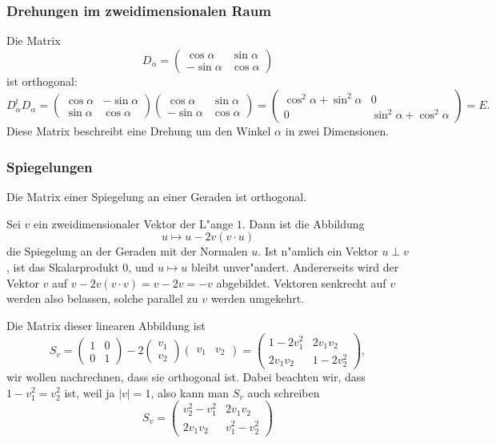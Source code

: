 \subsubsection{Drehungen im zweidimensionalen Raum}
Die Matrix
\[
D_\alpha
=
\begin{pmatrix}
\cos\alpha&\sin\alpha\\
-\sin\alpha&\cos\alpha
\end{pmatrix}
\]
ist orthogonal:
\[
D_\alpha^tD_\alpha
=
\begin{pmatrix}
\cos\alpha&-\sin\alpha\\
\sin\alpha&\cos\alpha
\end{pmatrix}
\begin{pmatrix}
\cos\alpha&\sin\alpha\\
-\sin\alpha&\cos\alpha
\end{pmatrix}
=
\begin{pmatrix}
\cos^2\alpha+\sin^2\alpha&0\\
0&\sin^2\alpha+\cos^2\alpha
\end{pmatrix}
=E.
\]
Diese Matrix beschreibt eine Drehung um den Winkel $\alpha$
in zwei Dimensionen.

\subsubsection{Spiegelungen}
Die Matrix einer Spiegelung an einer Geraden ist orthogonal.

\smallskip

{\parindent 0pt
Sei} $v$ ein zweidimensionaler Vektor der L"ange $1$. Dann ist
die Abbildung 
\[
u\mapsto u-2v(v\cdot u)
\]
die Spiegelung an der Geraden mit der Normalen $u$. Ist n"amlich
ein Vektor $u\perp v$, ist das Skalarprodukt $0$, und $u\mapsto u$
bleibt unver"andert. Andererseits wird der Vektor $v$ auf
$v-2v(v\cdot v)=v-2v=-v$ abgebildet. Vektoren senkrecht auf $v$
werden also belassen, solche parallel zu $v$ werden umgekehrt.

Die Matrix dieser linearen Abbildung ist
\[
S_v=\begin{pmatrix}1&0\\0&1\end{pmatrix}
-
2\begin{pmatrix}v_1\\v_2\end{pmatrix}
\begin{pmatrix}v_1&v_2\end{pmatrix}
=
\begin{pmatrix}
1-2v_1^2&2v_1v_2\\
2v_1v_2&1-2v_2^2
\end{pmatrix},
\]
wir wollen nachrechnen, dass sie orthogonal ist. Dabei beachten
wir, dass $1-v_1^2=v_2^2$ ist, weil ja $|v|=1$, also kann man $S_v$
auch schreiben
\[
S_v=\begin{pmatrix}
v_2^2-v_1^2&2v_1v_2\\
2v_1v_2&v_1^2-v_2^2
\end{pmatrix}
\]

